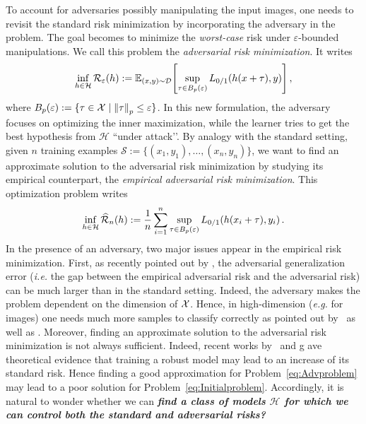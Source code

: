To account for adversaries possibly manipulating the input images, one needs to revisit the standard risk minimization by incorporating the adversary in the problem. The goal becomes to minimize the \emph{worst-case} risk under $\varepsilon$-bounded manipulations. We call this problem the \emph{adversarial risk minimization}. It writes
\begin{equation}
\inf_{\hypothesis \in \mathcal{H}} \risk_\varepsilon(\hypothesis) := \mathbb{E}_{(x ,y)\sim \mathcal{D}}\left[  \sup_{ \perturb \in B_p(\varepsilon)}\zerooneloss\left(\hypothesis(x  + {\tau}), y\right)\right]\equationspace, \label{eq:Advproblem}
\end{equation}
where $B_p(\varepsilon) :=\{ \tau \in \mathcal{X} \mid\norm{{\tau}}_p \leq \varepsilon\}$. In this new formulation, the adversary focuses on optimizing the inner maximization, while the learner tries to get the best hypothesis from $\mathcal{H}$ ``under attack’’. By analogy with the standard setting, given $n$ training examples $\mathcal{S}:=\{({x_1},y_1),\dots ,({x_n},y_n)\}$, we want to find an approximate solution to the adversarial risk minimization by studying its empirical counterpart, the \emph{empirical adversarial risk minimization}. This optimization problem writes
\begin{equation}
\inf_{\hypothesis \in \mathcal{H}} \widehat{\risk}_\numsamples(\hypothesis) := \frac1n\sum_{i=1}^{n} \sup_{\perturb \in B_p(\varepsilon)}\zerooneloss\left(\hypothesis({x_i} + {\tau}), y_i\right)\equationspace. \label{eq:EmpAdvproblem}
\end{equation}
In the presence of an adversary, two major issues appear in the empirical risk minimization. First, as recently pointed out by \cite{madry2017towards}, the adversarial generalization error (\emph{i.e.} the gap between the empirical adversarial risk and the adversarial risk) can be much larger than in the standard setting. Indeed, the adversary makes the problem dependent on the dimension of $\mathcal{X}$. Hence, in high-dimension (\emph{e.g.} for images) one needs much more samples to classify correctly as pointed out by~\cite{schmidt2018adversarially} as well as \cite{simon2019first}. Moreover, finding an approximate solution to the adversarial risk minimization is not always sufficient. Indeed, recent works by~\cite{tsipras2018robustness} and \cite{zhang2019theoretically} g ave theoretical evidence that training a robust model may lead to an increase of its standard risk. Hence finding a good approximation for Problem~\eqref{eq:Advproblem} may lead to a poor solution for Problem~\eqref{eq:Initialproblem}. Accordingly, it is natural to wonder whether we can \textbf{\emph{find a class of models $\boldsymbol{\mathcal{H}}$ for which we can control both the standard and adversarial risks?}}


